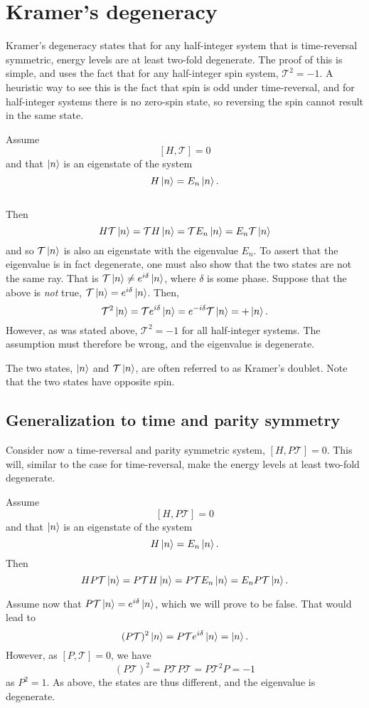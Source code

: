 \section{Kramer's degeneracy}\label{sec:kramers}


Kramer's degeneracy states that for any half-integer system that is time-reversal symmetric, energy levels are at least two-fold degenerate.
The proof of this is simple, and uses the fact that for any half-integer spin system, $\mathcal{T}^2 = -1$.
A heuristic way to see this is the fact that spin is odd under time-reversal, and for half-integer systems there is no zero-spin state, so reversing the spin cannot result in the same state.
\begin{Proof}
  Assume
  $$ [H, \mathcal{T}] = 0 $$
  and that $\ket{n}$ is an eigenstate of the system
  $$ H \ket{n} = E_n \ket{n}.$$\\
  Then
  $$
  H \mathcal{T} \ket{n} = \mathcal{T} H \ket{n} = \mathcal{T} E_n \ket{n} = E_n \mathcal{T} \ket{n}
  $$
  and so $\mathcal{T} \ket{n}$ is also an eigenstate with the eigenvalue $E_n$.
  To assert that the eigenvalue is in fact degenerate, one must also show that the two states are not the same ray.
  That is $\mathcal{T} \ket{n} \neq e^{i \delta} \ket{n}$, where $\delta$ is some phase.
  Suppose that the above is \emph{not} true, $\mathcal{T} \ket{n} = e^{i \delta} \ket{n}$.
  Then,
  $$
  \mathcal{T}^2 \ket{n} = \mathcal{T} e^{i\delta} \ket{n} = e^{-i\delta} \mathcal{T} \ket{n} = + \ket{n}.
  $$
  However, as was stated above, $\mathcal{T}^2 = -1$ for all half-integer systems.
  The assumption must therefore be wrong, and the eigenvalue is degenerate.
\end{Proof}
The two states, $\ket{n}$ and $\mathcal{T} \ket{n}$, are often referred to as Kramer's doublet.
Note that the two states have opposite spin.

\subsection{Generalization to time and parity symmetry}
Consider now a time-reversal and parity symmetric system, $[H, P \mathcal{T}] = 0$.
This will, similar to the case for time-reversal, make the energy levels at least two-fold degenerate.
\begin{Proof}
  Assume
  $$
  [H,P \mathcal{T}] = 0
  $$
  and that $\ket{n}$ is an eigenstate of the system
  $$
  H\ket{n} = E_n\ket{n}.
  $$
  Then
  $$
  H P \mathcal{T}\ket{n} =
  P\mathcal{T} H \ket{n} =
  P \mathcal{T} E_n \ket{n} =
  E_n P\mathcal{T} \ket{n}.
  $$

  Assume now that $P\mathcal{T} \ket{n} = e^{i\delta} \ket{n}$, which we will prove to be false.
  That would lead to
  $$
  (P\mathcal{T})^2 \ket{n} = P\mathcal{T} e^{i\delta} \ket{n}
  = \ket{n}.
  $$
  However, as $[P, \mathcal{T}] = 0$, we have
  $$
  (P\mathcal{T})^2 =
  P\mathcal{T} P \mathcal{T}=
  P\mathcal{T}^2 P=
  -1
  $$
  as $P^2 = 1$.
  As above, the states are thus different, and the eigenvalue is degenerate.
\end{Proof}
